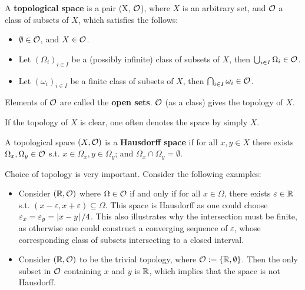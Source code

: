 \documentclass{article}
\begin{document}
\begin{definition}
    A \textbf{topological space} is a pair (X, $\mathcal{O}$), where $X$ is an arbitrary set, and $\mathcal{O}$ a class of subsets of $X$, which satisfies the follows:
    \begin{itemize}
        \item $\emptyset \in \mathcal{O}$, and $X \in \mathcal{O}$.
        \item Let $(\Omega_i)_{i \in I}$ be a (possibly infinite) class of subsets of $X$, then $\bigcup_{i \in I} \Omega_i \in \mathcal{O}$.
        \item Let $(\omega_i)_{i \in I}$ be a finite class of subsets of $X$, then $\bigcap_{i \in I} \omega_i \in \mathcal{O}$.
    \end{itemize}
    Elements of $\mathcal{O}$ are called the \textbf{open sets}. $\mathcal{O}$ (as a class) gives the topology of $X$. 
\end{definition}

\begin{remark}
    If the topology of $X$ is clear, one often denotes the space by simply $X$. 
\end{remark}

\begin{definition}
    A topological space $(X, \mathcal{O})$ is a \textbf{Hausdorff space} if for all $x, y \in X$ there exists $\Omega_x, \Omega_y \in \mathcal{O}$ s.t. $x \in \Omega_x, y \in \Omega_y$; and $\Omega_x \cap \Omega_y = \emptyset$.
\end{definition}

\begin{example}
    Choice of topology is very important. Consider the following examples:
    \begin{itemize}
        \item Consider $(\mathbb{R}, \mathcal{O})$ where $\Omega \in \mathcal{O}$ if and only if for all $x \in \Omega$, there exists $\varepsilon \in \mathbb{R}$ s.t. $(x - \varepsilon, x + \varepsilon) \subseteq \Omega$. This space is Hausdorff as one could choose $\varepsilon_x = \varepsilon_y = \left|x - y\right|/4$. This also illustrates why the intersection must be finite, as otherwise one could construct a converging sequence of $\varepsilon$, whose corresponding class of subsets intersecting to a closed interval.
        \item Consider $(\mathbb{R}, \mathcal{O})$ to be the trivial topology, where $\mathcal{O} := \{\mathbb{R}, \emptyset\}$. Then the only subset in $\mathcal{O}$ containing $x$ and $y$ is $\mathbb{R}$, which implies that the space is not Hausdorff.
    \end{itemize}
\end{example}
\end{document}
